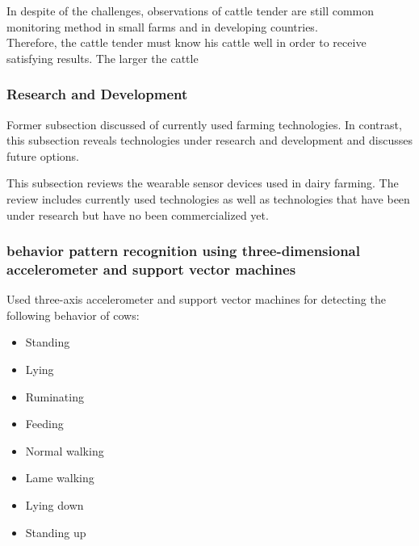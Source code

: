 \documentclass[english,12pt,a4paper,pdftex,elec,utf8]{aaltothesis}
\begin{document}
In despite of the challenges, observations of cattle tender are still common monitoring method in small farms and in developing countries. \cite{BRUNASSI2010} \\ 

Therefore, the cattle tender must know his cattle well in order to receive satisfying results. The larger the cattle \\


\subsubsection{Research and Development} \label{researchanddevelopmentsection}

Former subsection discussed of currently used farming technologies. In contrast, this subsection reveals technologies under research and development and discusses future options.
 
 This subsection reviews the wearable sensor devices used in dairy farming. The review includes currently used technologies as well as technologies that have been under research but have no been commercialized yet. 

 
 
 
 
\subsubsection*{behavior pattern recognition using three-dimensional accelerometer and support vector machines}

Used three-axis accelerometer and support vector machines for detecting the following behavior of cows:

\begin{itemize}
\item Standing
\item Lying
\item Ruminating
\item Feeding
\item Normal walking
\item Lame walking
\item Lying down
\item Standing up
\end{itemize}
\end{document}
